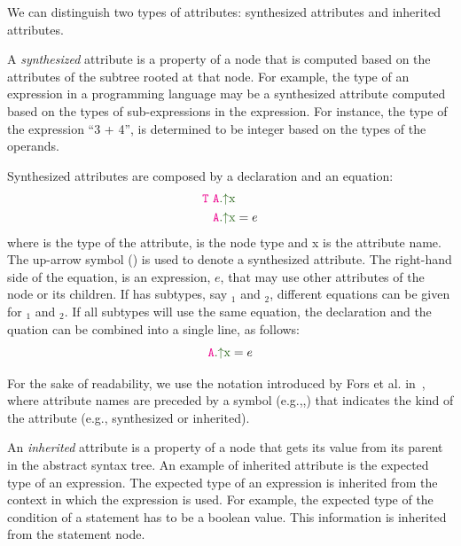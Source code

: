 We can distinguish two types of attributes: synthesized attributes and inherited attributes.

A \emph{synthesized} attribute is a property of a node that is computed
based on the attributes of the subtree rooted at that node. For example, the type of an expression
in a programming language may be a synthesized attribute computed based
on the types of sub-expressions in the expression. For instance, the type of the expression ``3 + 4'',
is determined to be integer based on the types of the operands.

Synthesized attributes are composed by a declaration and an equation:
\begin{align*}
  \astnode{T}\ &\Asyn{A}{x} \\
   &\Asyn{A}{x} = e
\end{align*}
where  is the type of the attribute,  is the node type and \textcolor{ATGsym}{x} is the attribute name.
The up-arrow symbol (\textcolor{ATGsym}{\mSyn{}}) is used to denote a synthesized attribute. 
The right-hand side of the equation, is an expression, $e$, that may use other attributes of the  node or its children.
If  has subtypes, say $_1$ and $_2$, different equations can be given for
$_1$ and $_2$. If all subtypes will use the same equation, the declaration and the quation can be combined 
into a single line, as follows:
\begin{equation*}
  \Asyn{A}{x} = e
\end{equation*}

For the sake of readability, we use the notation introduced by Fors et al. in~\cite{fors2020patterns},
where attribute names are preceded by a symbol (e.g.,\textcolor{ATGsym}{\mSyn{}},\textcolor{ATGsym}{\mInh{}}) 
that indicates the kind of the attribute (e.g., synthesized or inherited).

An \emph{inherited} attribute is a property of a node that gets its value from
its parent in the abstract syntax tree.
An example of inherited attribute is the expected type of an expression.
The expected type of an expression is inherited from the context in which the expression is used.
For example, the expected type of the condition of a  statement has to be a boolean value.
This information is inherited from the  statement node.

